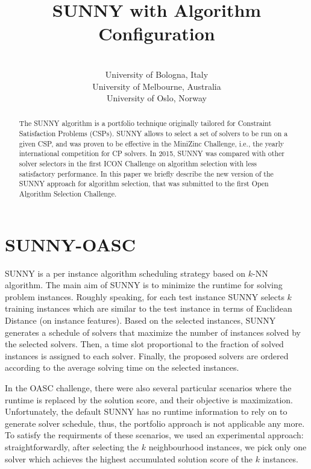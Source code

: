 \documentclass[tablecaption=bottom,wcp]{jmlr} %
\title[SUNNY-OASC]{SUNNY with Algorithm Configuration}
\author{\Name{Tong Liu} \Email{t.liu@unibo.it}\\
 \addr University of Bologna, Italy 
 \AND
 \Name{Roberto Amadini} \Email{roberto.amadini@unimelb.edu.au}\\
 \addr University of Melbourne, Australia
 \AND
 \Name{Jacopo Mauro} \Email{mauro.jacopo@gmail.com}\\
 \addr University of Oslo, Norway
 }
\begin{document}
\maketitle

\begin{abstract}%
The SUNNY algorithm is a portfolio technique originally tailored for 
Constraint Satisfaction Problems (CSPs). SUNNY allows to select a set of 
solvers to be run on a given CSP, and was proven to be effective in the 
MiniZinc Challenge, i.e., the yearly international competition 
for CP solvers. In 2015, SUNNY was compared with other solver selectors in the 
first ICON Challenge on algorithm selection with less satisfactory performance.
In this paper we briefly describe the new version of the SUNNY approach for 
algorithm selection, that was submitted to the first Open Algorithm 
Selection Challenge.
\end{abstract}


\section{SUNNY-OASC}


SUNNY is a per instance algorithm scheduling strategy based on $k$-NN algorithm.
The main aim of SUNNY is to minimize the runtime for solving problem instances. 
Roughly speaking, for each test instance SUNNY selects
$k$ training instances which are similar to the test instance
in terms of Euclidean Distance (on instance features). Based on the selected instances,
SUNNY generates a schedule of solvers that maximize the number of
instances solved by the selected solvers. 
Then, a time slot proportional to the fraction of solved instances is
assigned to each solver. Finally, the proposed solvers are ordered
according to the average solving time on the selected instances.

In the OASC challenge, there were also several particular scenarios
where the runtime is replaced by the solution score, and their objective is
maximization. Unfortunately, the default SUNNY has no runtime information to rely on
to generate solver schedule, thus, the portfolio approach is
not applicable any more. To satisfy the requirments of these scenarios, 
we used an experimental approach:
straightforwardly, after selecting the $k$ neighbourhood instances, 
we pick only one solver which achieves the highest accumulated solution score of the $k$ instances.
\end{document}
